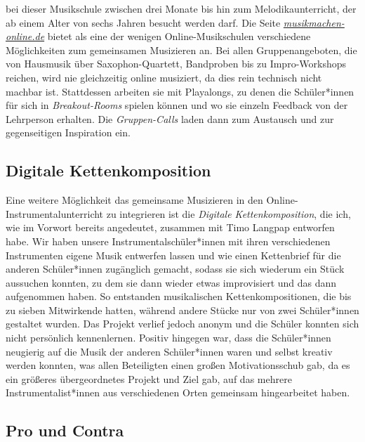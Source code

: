 bei dieser Musikschule zwischen drei Monate bis hin zum Melodikaunterricht, der
ab einem Alter von sechs Jahren besucht werden darf.
\autocite{online_musikschule_emp} Die Seite \emph{\href{https://musikmachen-online.de/}{musikmachen-online.de}} bietet
als eine der wenigen Online-Musikschulen verschiedene Möglichkeiten zum
gemeinsamen Musizieren an. \autocite{online_musikschule_mmo} Bei allen
Gruppenangeboten, die von Hausmusik über Saxophon-Quartett, Bandproben bis zu
Impro-Workshops reichen, wird nie gleichzeitig online musiziert, da dies rein
technisch nicht machbar ist. Stattdessen arbeiten sie mit Playalongs, zu denen
die Schüler*innen für sich in \emph{Breakout-Rooms} spielen können und wo sie
einzeln Feedback von der Lehrperson erhalten. Die \emph{Gruppen-Calls} laden
dann zum Austausch und zur gegenseitigen Inspiration ein.
\autocite{online_musikschule_mmo}



\subsection{Digitale Kettenkomposition}

Eine weitere Möglichkeit das gemeinsame Musizieren in den
Online-Instrumentalunterricht zu integrieren ist die \emph{Digitale
Kettenkomposition}, die ich, wie im Vorwort bereits angedeutet, zusammen mit
Timo Langpap entworfen habe. Wir haben unsere Instrumentalschüler*innen mit
ihren verschiedenen Instrumenten eigene Musik entwerfen lassen und wie einen
Kettenbrief für die anderen Schüler*innen zugänglich gemacht, sodass sie sich
wiederum ein Stück aussuchen konnten, zu dem sie dann wieder etwas improvisiert
und das dann aufgenommen haben. So entstanden musikalischen Kettenkompositionen,
die bis zu sieben Mitwirkende hatten, während andere Stücke nur von zwei
Schüler*innen gestaltet wurden. Das Projekt verlief jedoch anonym und die
Schüler konnten sich nicht persönlich kennenlernen. Positiv hingegen war, dass
die Schüler*innen neugierig auf die Musik der anderen Schüler*innen waren und
selbst kreativ werden konnten, was allen Beteiligten einen großen
Motivationsschub gab, da es ein größeres übergeordnetes Projekt
und Ziel gab, auf das mehrere Instrumentalist*innen aus verschiedenen Orten
gemeinsam hingearbeitet haben. 


\subsection{Pro und Contra}

